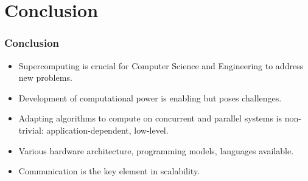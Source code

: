\section{Conclusion}

\begin{frame}
  \frametitle{Conclusion}

\begin{itemize}
\item Supercomputing is crucial for Computer Science and Engineering to address new problems.
\item Development of computational power is enabling but poses challenges.
\item Adapting algorithms to compute on concurrent and parallel systems is non-trivial: application-dependent, low-level.
\item Various hardware architecture, programming models, languages available.
\item Communication is the key element in scalability.
\end{itemize}
\end{frame}


